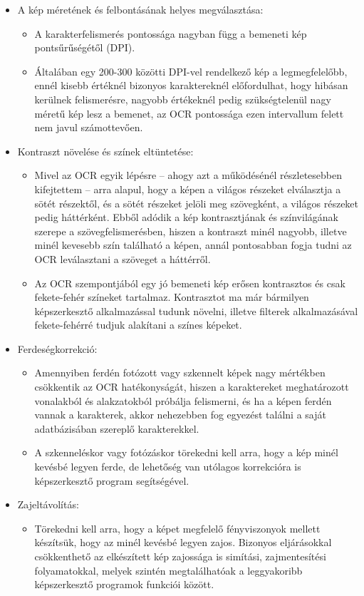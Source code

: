 \documentclass[12pt]{report}
\begin{document}
\begin{itemize}
    \item A kép méretének és felbontásának helyes megválasztása:
    \begin{itemize}
	   \item A karakterfelismerés pontossága nagyban függ a bemeneti kép pontsűrűségétől (DPI). 
       \item Általában egy 200-300 közötti DPI-vel rendelkező kép a legmegfelelőbb, ennél kisebb értéknél bizonyos karaktereknél előfordulhat, hogy hibásan kerülnek felismerésre, nagyobb értékeknél pedig szükségtelenül nagy méretű kép lesz a bemenet, az OCR pontossága ezen intervallum felett nem javul számottevően.
    \end{itemize}
    \item Kontraszt növelése és színek eltüntetése:
    \begin{itemize}
	   \item Mivel az OCR egyik lépésre – ahogy azt a működésénél részletesebben kifejtettem –  arra alapul, hogy a képen a világos részeket elválasztja a sötét részektől, és a sötét részeket jelöli meg szövegként, a világos részeket pedig háttérként. Ebből adódik a kép kontrasztjának és színvilágának szerepe a szövegfelismerésben, hiszen a kontraszt minél nagyobb, illetve minél kevesebb szín található a képen, annál pontosabban fogja tudni az OCR leválasztani a szöveget a háttérről.
       \item Az OCR szempontjából egy jó bemeneti kép erősen kontrasztos és csak fekete-fehér színeket tartalmaz. Kontrasztot ma már bármilyen képszerkesztő alkalmazással tudunk növelni, illetve filterek alkalmazásával fekete-fehérré tudjuk alakítani a színes képeket.
    \end{itemize}
    \pagebreak
    \item Ferdeségkorrekció:
    \begin{itemize}
	   \item Amennyiben ferdén fotózott vagy szkennelt képek nagy mértékben csökkentik az OCR hatékonyságát, hiszen a karaktereket meghatározott vonalakból és alakzatokból próbálja felismerni, és ha a képen ferdén vannak a karakterek, akkor nehezebben fog egyezést találni a saját adatbázisában szereplő karakterekkel.
       \item A szkenneléskor vagy fotózáskor törekedni kell arra, hogy a kép minél kevésbé legyen ferde, de lehetőség van utólagos korrekcióra is képszerkesztő program segítségével.
    \end{itemize}
    \item Zajeltávolítás:
    \begin{itemize}
	   \item Törekedni kell arra, hogy a képet megfelelő fényviszonyok mellett készítsük, hogy az minél kevésbé legyen zajos. Bizonyos eljárásokkal csökkenthető az elkészített kép zajossága is simítási, zajmentesítési folyamatokkal, melyek szintén megtalálhatóak a leggyakoribb képszerkesztő programok funkciói között.
    \end{itemize}
\end{itemize}
\end{document}
